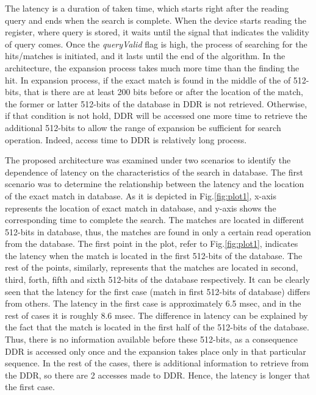 \begin{table}[]
\begin{center}
\caption {Time and Frequency Characteristics} \label{tab:timingSlack}
\end{center}
\end{table}


The latency is a duration of taken time, which starts right after the reading query and ends when the search is complete. When the device starts reading the register, where query is stored, it waits until the signal that indicates the validity of query comes. Once the \textit{queryValid} flag is high, the process of searching for the hits/matches is initiated, and it lasts until the end of the algorithm. In the architecture, the expansion process takes much more time than the finding the hit. In expansion process, if the exact match is found in the middle of the of 512-bits, that is there are at least 200 bits before or after the location of the match, the former or latter 512-bits of the database in DDR is not retrieved. Otherwise, if that condition is not hold, DDR will be accessed one more time to retrieve the additional 512-bits to allow the range of expansion be sufficient for search operation. Indeed, access time to DDR is relatively long process.


The proposed architecture was examined under two scenarios to identify the dependence of latency on the characteristics of the search in database. The first scenario was to determine the relationship between the latency and the location of the exact match in database. As it is depicted in Fig.\ref{fig:plot1}, x-axis represents the location of exact match in database, and y-axis shows the corresponding time to complete the search. The matches are located in different 512-bits in database, thus, the matches are found in only a certain read operation from the database. The first point in the plot, refer to Fig.\ref{fig:plot1}, indicates the latency when the match is located in the first 512-bits of the database. The rest of the points, similarly, represents that the matches are located in second, third, forth, fifth and sixth 512-bits of the database respectively. It can be clearly seen that the latency for the first case (match in first 512-bits of database) differs from others. The latency in the first case is approximately 6.5 msec, and in the rest of cases it is roughly 8.6 msec. The difference in latency can be explained by the fact that the match is located in the first half of the 512-bits of the database. Thus, there is no information available before these 512-bits, as a consequence DDR is accessed only once and the expansion takes place only in that particular sequence. In the rest of the cases, there is additional information  to retrieve from the DDR, so there are 2 accesses made to DDR. Hence, the latency is longer that the first case.


